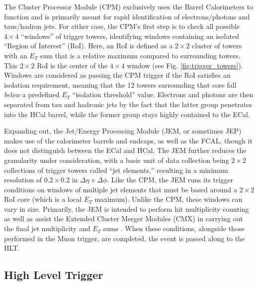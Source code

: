         The Cluster Processor Module (CPM) exclusively uses the Barrel Calorimeters to function
            and is primarily meant for rapid identification of electrons/photons and taus/hadron jets.
        For either case, the CPM's first step is to check all possible $4 \times 4$ ``windows'' of trigger towers, identifying windows containing an isolated ``Region of Interest'' (RoI).
        Here, an RoI is defined as a $2 \times 2$ cluster of towers with an $E_T$ sum that is a relative maximum compared to surrounding towers.
        This $2 \times 2$ RoI is the center of the $4 \times 4$ window (see Fig. \ref{fig:trigger_towers}).
        Windows are considered as passing the CPM trigger if the RoI satisfies an isolation requirement,
            meaning that the 12 towers surrounding that core fall \textit{below} a predefined $E_T$ ``isolation threshold'' value.
        Electrons and photons are then separated from tau and hadronic jets by the fact that the latter group penetrates into the HCal barrel,
            while the former group stays highly contained to the ECal.

        Expanding out, the Jet/Energy Processing Module (JEM, or sometimes JEP) makes use of the calorimeter barrels and endcaps, as well as the FCAL, though it does not distinguish between the ECal and HCal.
        The JEM further reduces the granularity under consideration, with a basic unit of data collection being $2 \times 2$ collections of trigger towers called ``jet elements,'' resulting in a minimum resolution of $0.2 \times 0.2$ in $\Delta \eta \times \Delta \phi$.
        Like the CPM, the JEM runs its trigger conditions on windows of multiple jet elements that must be based around a $2 \times 2$ RoI core (which is a local $E_T$ maximum).
        Unlike the CPM, these windows can vary in size.
        Primarily, the JEM is intended to perform hit multiplicity counting
            as well as assist the Extended Cluster Merger Modules (CMX) in carrying out the final jet multiplicity
            and $E_T$ sums \cite{L1_calo_run1}\cite{trigger_run2}.
        When these conditions, alongside those performed in the Muon trigger, are completed, the event is passed along to the HLT.


\FloatBarrier
    \subsection{High Level Trigger}

